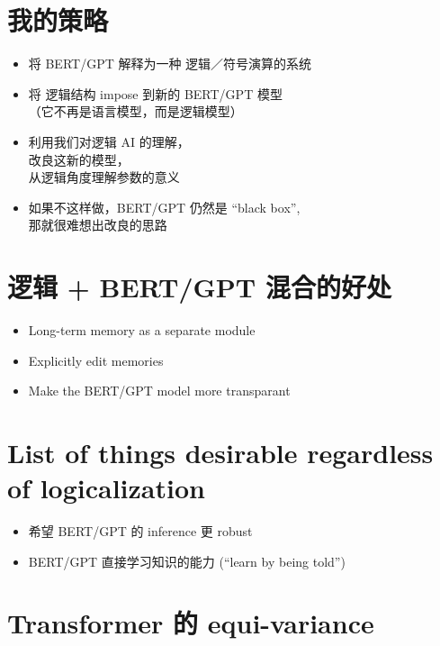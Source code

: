 \setcounter{section}{-1}
\section{我的策略}

\begin{itemize}
	\item 将 BERT/GPT 解释为一种 逻辑／符号演算的系统
	\item 将 逻辑结构 impose 到新的 BERT/GPT 模型 \\
		（它不再是语言模型，而是逻辑模型）
	\item 利用我们对逻辑 AI 的理解， \\
		改良这新的模型，\\
		从逻辑角度理解参数的意义
	\item 如果不这样做，BERT/GPT 仍然是 ``black box'', \\
		那就很难想出改良的思路
\end{itemize}

\section{逻辑 + BERT/GPT 混合的好处}

\begin{itemize}
	\item Long-term memory as a separate module
	\item Explicitly edit memories
	\item Make the BERT/GPT model more transparant
\end{itemize}

\section{List of things desirable regardless of logicalization}

\begin{itemize}
	\item 希望 BERT/GPT 的 inference 更 robust
	\item BERT/GPT 直接学习知识的能力 (``learn by being told'')
\end{itemize}

\section{Transformer 的 equi-variance}

